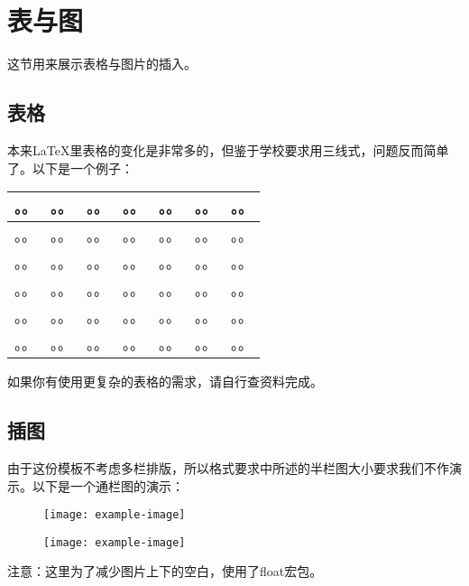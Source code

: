 \section{表与图}这节用来展示表格与图片的插入。

\subsection{表格}
\par 本来LaTeX里表格的变化是非常多的，但鉴于学校要求用三线式，问题反而简单了。以下是一个例子：
\begin{table}[htbp]\center
    \begin{tabular}{lcccccl}
     \toprule
     。。 & 。。 & 。。 & 。。 & 。。& 。。 & 。。\\
     \midrule
    。。 & 。。 & 。。 & 。。 & 。。& 。。 & 。。\\
    。。 & 。。 & 。。 & 。。 & 。。& 。。 & 。。\\
    。。 & 。。 & 。。 & 。。 & 。。& 。。 & 。。\\
    。。 & 。。 & 。。 & 。。 & 。。& 。。 & 。。\\
    。。 & 。。 & 。。 & 。。 & 。。& 。。 & 。。\\
     \bottomrule
    \end{tabular}
   \end{table}
如果你有使用更复杂的表格的需求，请自行查资料完成。

\subsection{插图}
由于这份模板不考虑多栏排版，所以格式要求中所述的半栏图大小要求我们不作演示。以下是一个通栏图的演示：
\begin{figure}[H]
    \centering
    \texttt{[image: example-image]}
  \end{figure}

\begin{figure}[H]
    \centering
    \texttt{[image: example-image]}
\end{figure}
\par 注意：这里为了减少图片上下的空白，使用了float宏包。